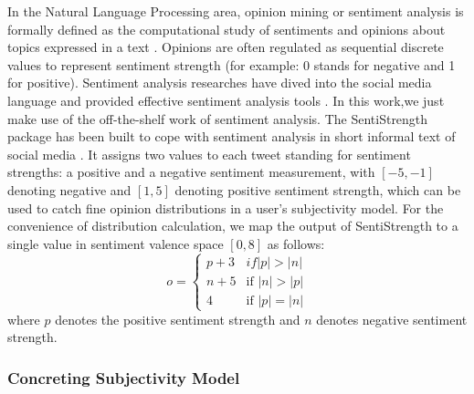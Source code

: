 \documentclass[letterpaper]{article}
\begin{document}
In the Natural Language Processing area, opinion mining or sentiment analysis is formally defined as the computational study of sentiments and opinions about topics expressed in a text \cite{liu2012sentiment}. Opinions are often regulated as sequential discrete values to represent sentiment strength (for example: 0 stands for negative and 1 for positive). Sentiment analysis researches have dived into the social media language and provided effective sentiment analysis tools \cite{thelwall2010sentiment,hu2013unsupervised}. In this work,we just make use of the off-the-shelf work of sentiment analysis.
The SentiStrength package has been built to cope with sentiment analysis in short informal text of social media \cite{thelwall2010sentiment}. 
It assigns two values to each tweet standing for sentiment strengths: a positive and a negative sentiment measurement, with $ \left[ -5,-1 \right]  $ denoting negative and $ \left[ 1,5 \right]  $ denoting positive sentiment strength, which can be used to catch fine opinion distributions in a user's subjectivity model.  
For the convenience of distribution calculation, we map the output of SentiStrength to a single value in sentiment valence space $ \left[ 0, 8 \right] $ as follows:
\begin{equation}
\label{opinionmap}
o= \left\{ 
\begin{array}{lll}
{p+3} & if \vert p \vert > \vert n \vert \\
{n+5} & \text{if } \vert n \vert > \vert p \vert \\
{4}  & \text{if } \vert p \vert = \vert n \vert
\end{array}
\right.
\end{equation}
where $ p $ denotes the positive sentiment strength and $ n $ denotes negative sentiment strength. 

\subsubsection{Concreting Subjectivity Model}
\label{concrete}
 
\end{document}
